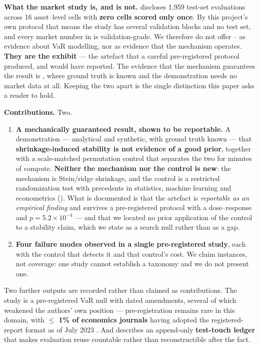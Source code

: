 \textbf{What the market study is, and is not.}  discloses 1,959 test-set evaluations across 16
asset--level cells with \textbf{zero cells scored only once}. By this project's own protocol that means
the study has several validation blocks and no test set, and every market number in  is
validation-grade. We therefore do not offer -- as evidence about VaR modelling, nor as
evidence that the mechanism operates. \textbf{They are the exhibit} --- the artefact that a careful
pre-registered protocol produced, and would have reported. The evidence that the mechanism
guarantees the result is , where ground truth is known and the demonstration needs no market
data at all. Keeping the two apart is the single distinction this paper asks a reader to hold.

\textbf{Contributions.} Two.

\begin{enumerate}
\def\labelenumi{\arabic{enumi}.}
\tightlist
\item
  \textbf{A mechanically guaranteed result, shown to be reportable.} A demonstration --- analytical
  and synthetic, with ground truth known --- that \textbf{shrinkage-induced stability is not evidence
  of a good prior}, together with a scale-matched permutation control that separates the two
  for minutes of compute. \textbf{Neither the mechanism nor the control is new}: the mechanism is
  Stein/ridge shrinkage, and the control is a restricted randomization test with precedents in
  statistics, machine learning and econometrics (). What is documented is that the artefact
  is \emph{reportable as an empirical finding} and survives a pre-registered protocol with a
  dose--response and \(p = 5.2 \times 10^{-4}\) --- and that we located no prior application of the
  control to a stability claim, which we state as a search null rather than as a gap.
\item
  \textbf{Four failure modes observed in a single pre-registered study}, each with the control that
  detects it and that control's cost. We claim instances, not coverage: one study cannot
  establish a taxonomy and we do not present one.
\end{enumerate}

Two further outputs are recorded rather than claimed as contributions. The study is a
pre-registered VaR null with dated amendments, several of which weakened the authors' own
position --- pre-registration remains rare in this domain, with \textbf{$\leq$ 1\% of economics journals}
having adopted the registered-report format as of July 2023 \citep{lin2024registered}. And 
describes an append-only \textbf{test-touch ledger} that makes evaluation reuse countable rather than
reconstructible after the fact.
